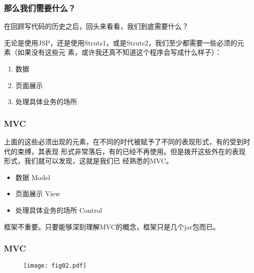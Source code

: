 \begin{frame}[fragile] %
\frametitle{那么我们需要什么？}

在回顾写代码的历史之后，回头来看看，我们到底需要什么？ 

无论是使用JSP，还是使用Struts1，或是Struts2，我们至少都需要一些必须的元素（如果没有这些元
素，或许我还真不知道这个程序会写成什么样子）：

\begin{enumerate}[<+-| alert@+>]
\item {\hei 数据 }
\item {\hei 页面展示 }
\item {\hei 处理具体业务的场所 }
\end{enumerate}
\end{frame}

\begin{frame}[fragile] %
\frametitle{MVC}

上面的这些必须出现的元素，在不同的时代被赋予了不同的表现形式，有的受到时代的束缚，其表现
形式非常落后，有的已经不再使用。但是拨开这些外在的表现形式，我们就可以发现，这就是我们已
经熟悉的MVC。

\begin{itemize}
\item 数据  Model 
\item 页面展示  View 
\item 处理具体业务的场所  Control 
\end{itemize}

{\hei 框架不重要。只要能够深刻理解MVC的概念，框架只是几个jar包而已。}
\end{frame}

\begin{frame}[fragile] %
\frametitle{MVC}

\begin{figure}
\centering
\texttt{[image: fig02.pdf]}
\end{figure}
\end{frame}

